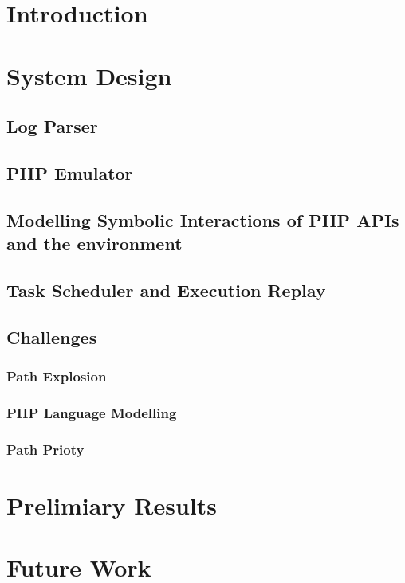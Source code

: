 \section{Introduction}

\section{System Design}

\subsection{Log Parser}
\subsection{PHP Emulator}
\subsection{Modelling Symbolic Interactions of PHP APIs and the environment}
\subsection{Task Scheduler and Execution Replay}
\subsection{Challenges}
\subsubsection{Path Explosion}
\subsubsection{PHP Language Modelling}
\subsubsection{Path Prioty}

\section{Prelimiary Results}

\section{Future Work}
